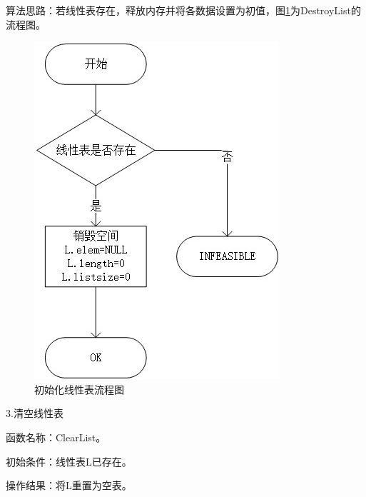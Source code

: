 \documentclass[supercite]{Experimental_Report}
\theoremstyle{definition}
\begin{document}
算法思路：若线性表存在，释放内存并将各数据设置为初值，图\ref{fig1-2}为DestroyList的流程图。
\begin{figure}[htb] %
	\begin{center}
		\includegraphics[scale=1]{./images/顺序表/destroy.jpg}
		\caption{初始化线性表流程图}
		\label{fig1-2}
	\end{center}
\end{figure}

\newpage

3.清空线性表

函数名称：ClearList。

初始条件：线性表L已存在。

操作结果：将L重置为空表。
\end{document}

